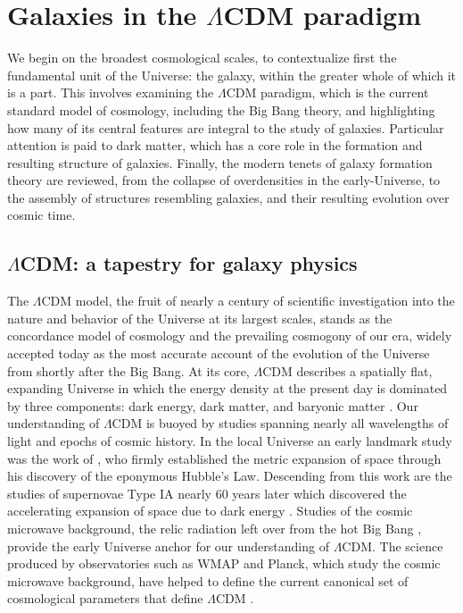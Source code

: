 \section{Galaxies in the \texorpdfstring{$\Lambda$CDM}{LambdaCDM} paradigm}

We begin on the broadest cosmological scales, to contextualize first the fundamental unit of the Universe: the galaxy, within the greater whole of which it is a part. This involves examining the $\Lambda$CDM paradigm, which is the current standard model of cosmology, including the Big Bang theory, and highlighting how many of its central features are integral to the study of galaxies. Particular attention is paid to dark matter, which has a core role in the formation and resulting structure of galaxies. Finally, the modern tenets of galaxy formation theory are reviewed, from the collapse of overdensities in the early-Universe, to the assembly of structures resembling galaxies, and their resulting evolution over cosmic time.

\subsection{\texorpdfstring{$\Lambda$CDM}{LambdaCDM}: a tapestry for galaxy physics}

The $\Lambda$CDM model, the fruit of nearly a century of scientific investigation into the nature and behavior of the Universe at its largest scales, stands as the concordance model of cosmology and the prevailing cosmogony of our era, widely accepted today as the most accurate account of the evolution of the Universe from shortly after the Big Bang. At its core, $\Lambda$CDM describes a spatially flat, expanding Universe in which the energy density at the present day is dominated by three components: dark energy, dark matter, and baryonic matter \parencite[e.g.][]{perlmutter99,wmap03,sdssbao05,planck15}. Our understanding of $\Lambda$CDM is buoyed by studies spanning nearly all wavelengths of light and epochs of cosmic history. In the local Universe an early landmark study was the work of \textcite{hubble29}, who firmly established the metric expansion of space through his discovery of the eponymous Hubble's Law. Descending from this work are the studies of supernovae Type IA nearly 60 years later which discovered the accelerating expansion of space due to dark energy \parencite{riess98,perlmutter99}. Studies of the cosmic microwave background, the relic radiation left over from the hot Big Bang \parencite{penzias65}, provide the early Universe anchor for our understanding of $\Lambda$CDM. The science produced by observatories such as WMAP and Planck, which study the cosmic microwave background, have helped to define the current canonical set of cosmological parameters that define $\Lambda$CDM \parencite{wmap03,planck15}.

